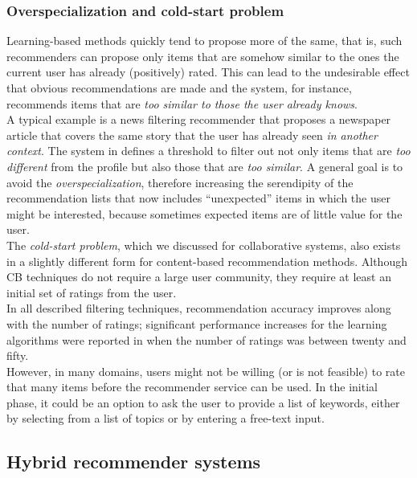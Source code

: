 \subsubsection{Overspecialization and cold-start problem}
\label{overspecialization}

Learning-based methods quickly tend to propose
more of the same, that is, such recommenders can propose only items
that are somehow similar to the ones the current user has already
(positively) rated. This can lead to the undesirable effect that
obvious recommendations are made and the system, for instance,
recommends items that are \textit{too similar to those the user already knows}.
\\A typical example is a news filtering recommender that proposes a
newspaper article that covers the same story that the user has already
seen \textit{in another context}. The system in \cite{billsus1999personal} 
defines a threshold to filter out not only items that
are \textit{too different} from the profile but also those that are \textit{too
similar}. A general goal is to avoid the \textit{overspecialization},
therefore increasing the serendipity of the recommendation lists
that now includes “unexpected” items in which the user might be
interested, because sometimes expected items are of little value for the user.\\
The \textit{cold-start problem}, which we discussed for collaborative
systems, also exists in a slightly different form for content-based
recommendation methods. Although CB techniques do not
require a large user community, they require at least an initial set
of ratings from the user. \\In all described filtering techniques,
recommendation accuracy improves along with the number of ratings;
significant performance increases for the learning algorithms were
reported in \cite{pazzani1997learning}  when the number of ratings was
between twenty and fifty. \\However, in many domains, users might not be
willing (or is not feasible) to rate that many items before the recommender service can be
used. In the initial phase, it could be an option to ask the user to
provide a list of keywords, either by selecting from a list of topics
or by entering a free-text input.

\subsection{Hybrid recommender systems} 

